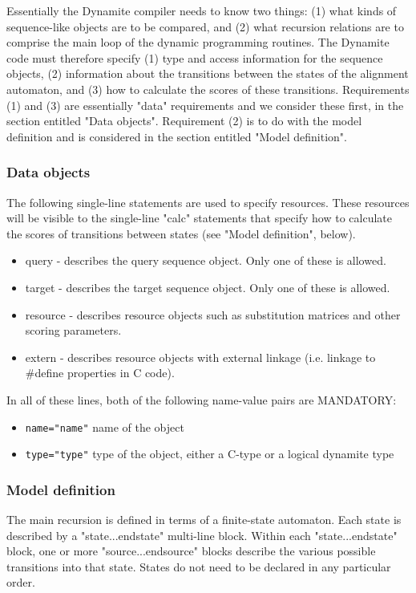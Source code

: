 Essentially the Dynamite compiler needs to know two things:
(1) what kinds of sequence-like objects are to be compared, and
(2) what recursion relations are to comprise the main loop
of the dynamic programming routines.
The Dynamite code must therefore specify (1) type and access
information for the sequence objects, (2) information about
the transitions between the states of the alignment automaton, and
(3) how to calculate the scores of these transitions.
Requirements (1) and (3) are essentially "data" requirements
and we consider these first, in the section entitled "Data objects".
Requirement (2) is to do with the model definition and is considered
in the section entitled "Model definition".


\subsubsection{Data objects}
The following single-line statements are used to specify
resources. These resources will be visible to the single-line "calc"
statements that specify how to calculate the scores of
transitions between states (see "Model definition", below).

\begin{itemize}
\item query - describes the query sequence object. Only one of these is allowed.
\item target - describes the target sequence object. Only one of these is allowed.
\item resource - describes resource objects such as substitution matrices and other scoring parameters.
\item extern - describes resource objects with external linkage (i.e. linkage to \#define properties in C code).
\end{itemize}

In all of these lines, both of the following name-value pairs are MANDATORY:

\begin{itemize}
\item {\tt name="name"} name of the object
\item {\tt type="type"} type of the object, either a C-type or a logical dynamite type
\end{itemize}


\subsubsection{Model definition}
The main recursion is defined in terms of a finite-state automaton.
Each state is described by a "state...endstate" multi-line block.
Within each "state...endstate" block,
one or more "source...endsource" blocks describe
the various possible transitions into that state.
States do not need to be declared in any particular order.

